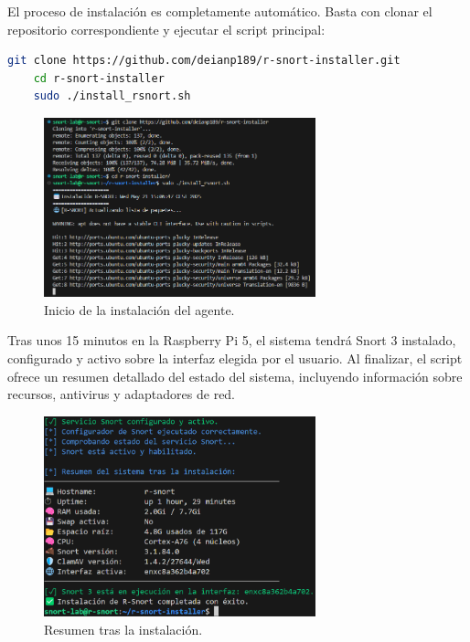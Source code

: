 \documentclass[11pt,a4paper,twoside]{report}
\begin{document}
El proceso de instalación es completamente automático. Basta con clonar el repositorio correspondiente y ejecutar el script principal:

\newpage

\begin{lstlisting}[language=bash, caption={Instalación de R-Snort personalizada}, label={lst:instalacion-rsnort}]
	git clone https://github.com/deianp189/r-snort-installer.git
	cd r-snort-installer
	sudo ./install_rsnort.sh
\end{lstlisting}

\begin{figure}[H]
	\centering
	\includegraphics[width=0.7\textwidth]{install/2.png}
	\caption{Inicio de la instalación del agente.}
	\label{fig:inicio-instalacion-rsnort}
\end{figure}

Tras unos 15 minutos en la Raspberry Pi 5, el sistema tendrá Snort 3 instalado, configurado y activo sobre la interfaz elegida por el usuario. Al finalizar, el script ofrece un resumen detallado del estado del sistema, incluyendo información sobre recursos, antivirus y adaptadores de red.

\begin{figure}[H]
	\centering
	\includegraphics[width=0.7\textwidth]{install/3.png}
	\caption{Resumen tras la instalación.}
	\label{fig:resumen-instalacion-rsnort}
\end{figure}
\end{document}
